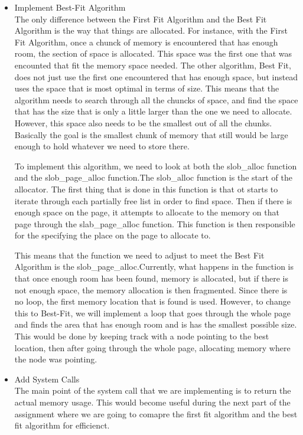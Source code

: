 \documentclass[10pt, onecolumn, letterpaper, draftclsnofoot]{IEEEtran}
\begin{document}
\begin{itemize}
\item{Implement Best-Fit Algorithm}\\
The only difference between the First Fit Algorithm and the Best Fit Algorithm is the way that things are allocated. For instance, with the First Fit Algorithm, once a chunck of memory is encountered that has enough room, the section of space is allocated. This space was the first one that was encounted that fit the memory space needed. The other algorithm, Best Fit, does not just use the first one encountered that has enough space, but instead uses the space that is most optimal in terms of size. This means that the algorithm needs to search through all the chuncks of space, and find the space that has the size that is only a little larger than the one we need to allocate. However, this space also needs to be the smallest out of all the chunks. Basically the goal is the smallest chunk of memory that still would be large enough to hold whatever we need to store there. \newline

To implement this algorithm, we need to look at both the slob\_alloc function and the slob\_page\_alloc function.The slob\_alloc function is the start of the allocator. The first thing that is done in this function is that ot starts to iterate through each partially free list in order to find space. Then if there is enough space on the page, it attempts to allocate to the memory on that page through the slab\_page\_alloc function. This function is then responsible for the specifying the place on the page to allocate to. \newline

This means that the function we need to adjust to meet the Best Fit Algorithm is the slob\_page\_alloc.Currently, what happens in the function is that once enough room has been found, memory is allocated, but if there is not enough space, the memory allocation is then fragmented. Since there is no loop, the first memory location that is found is used. However, to change this to Best-Fit, we will implement a loop that goes through the whole page and finds the area that has enough room and is has the smallest possible size. This would be done by keeping track with a node pointing to the best location, then after going through the whole page, allocating memory where the node was pointing. \newline

\item{Add System Calls}\\
\noindent The main point of the system call that we are implementing is to return the actual memory usage. This would become useful during the next part of the assignment where we are going to comapre the first fit algorithm and the best fit algorithm for efficienct. \newline


\end{itemize}
\end{document}

